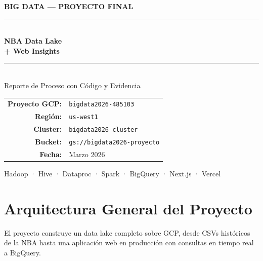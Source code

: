 \documentclass[12pt, letterpaper]{article}
\begin{document}
\begin{titlepage}
  \pagecolor{primary}\color{white}
  \vspace*{3cm}
  \begin{center}
    {\small\color{accent}\textbf{\MakeUppercase{Big Data --- Proyecto Final}}}\\[0.5cm]
    \rule{10cm}{1.2pt}\\[0.8cm]
    {\Huge\bfseries NBA Data Lake}\\[0.3cm]
    {\LARGE\bfseries + Web Insights}\\[0.8cm]
    \rule{10cm}{0.4pt}\\[1.2cm]
    {\large Reporte de Proceso con Código y Evidencia}\\[2.5cm]
    \begin{tabular}{rl}
      \textbf{Proyecto GCP:}  & \texttt{bigdata2026-485103} \\[4pt]
      \textbf{Región:}        & \texttt{us-west1} \\[4pt]
      \textbf{Cluster:}       & \texttt{bigdata2026-cluster} \\[4pt]
      \textbf{Bucket:}        & \texttt{gs://bigdata2026-proyecto} \\[4pt]
      \textbf{Fecha:}         & Marzo 2026 \\
    \end{tabular}
    \vfill
    {\small\color{muted}Hadoop · Hive · Dataproc · Spark · BigQuery · Next.js · Vercel}
  \end{center}
\end{titlepage}
\nopagecolor

\thispagestyle{empty}
\tableofcontents
\newpage

\section{Arquitectura General del Proyecto}

El proyecto construye un data lake completo sobre GCP, desde CSVs históricos de la NBA hasta una aplicación web en producción con consultas en tiempo real a BigQuery.
\end{document}
